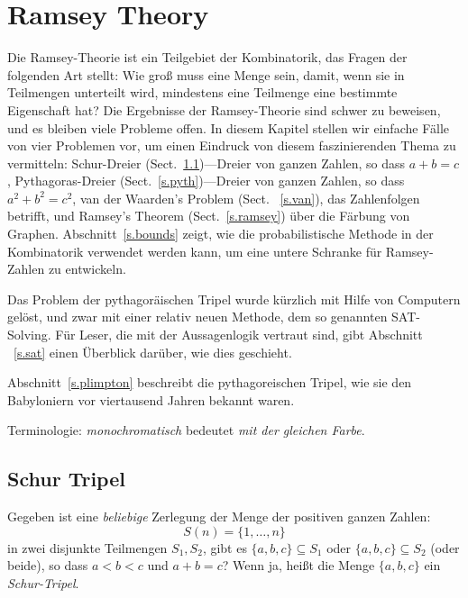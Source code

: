 
\chapter{Ramsey Theory}\label{c.ramsey}


Die Ramsey-Theorie ist ein Teilgebiet der Kombinatorik, das Fragen der folgenden Art stellt: Wie groß muss eine Menge sein, damit, wenn sie in Teilmengen unterteilt wird, mindestens eine Teilmenge eine bestimmte Eigenschaft hat?
Die Ergebnisse der Ramsey-Theorie sind schwer zu beweisen, und es bleiben viele Probleme offen. In diesem Kapitel stellen wir einfache Fälle von vier Problemen vor, um einen Eindruck von diesem faszinierenden Thema zu vermitteln: Schur-Dreier (Sect.~\ref{s.schur})---Dreier von ganzen Zahlen, so dass $a+b=c$, Pythagoras-Dreier (Sect.~\ref{s.pyth})---Dreier von ganzen Zahlen, so dass $a^2+b^2=c^2$, van der Waarden's Problem (Sect. ~\ref{s.van}), das Zahlenfolgen betrifft, und Ramsey's Theorem (Sect.~\ref{s.ramsey}) über die Färbung von Graphen. Abschnitt~\ref{s.bounds} zeigt, wie die probabilistische Methode in der Kombinatorik verwendet werden kann, um eine untere Schranke für Ramsey-Zahlen zu entwickeln.

Das Problem der pythagoräischen Tripel wurde kürzlich mit Hilfe von Computern gelöst, und zwar mit einer relativ neuen Methode, dem so genannten SAT-Solving. Für Leser, die mit der Aussagenlogik vertraut sind, gibt Abschnitt ~\ref{s.sat} einen Überblick darüber, wie dies geschieht.

Abschnitt~\ref{s.plimpton} beschreibt die pythagoreischen Tripel, wie sie den Babyloniern vor viertausend Jahren bekannt waren.

Terminologie: \emph{monochromatisch} bedeutet \emph{mit der gleichen Farbe}.

\section{Schur Tripel}\label{s.schur}


\begin{definition}
Gegeben ist eine \emph{beliebige} Zerlegung der Menge der positiven ganzen Zahlen:
\[
S(n)=\{1,\ldots,n\}
\]
in zwei disjunkte Teilmengen $S_1,S_2$, gibt es $\{a,b,c\}\subseteq S_1$ oder $\{a,b,c\}\subseteq S_2$ (oder beide), so dass $a\!<\!b\!<\!c$ und $a+b=c$? Wenn ja, heißt die Menge $\{a,b,c\}$ ein \emph{Schur-Tripel}.
\end{definition}

